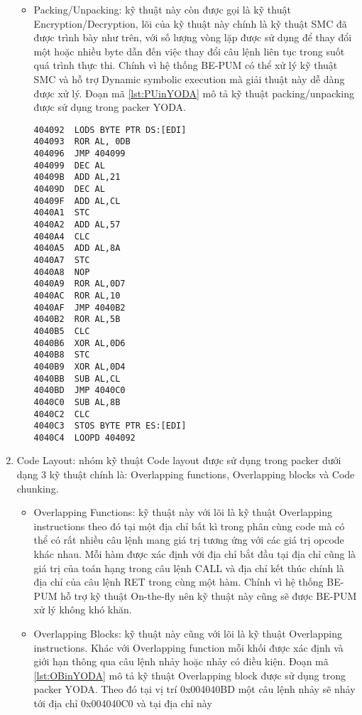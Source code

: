 \begin{enumerate}
{\begin{itemize}
{\begin{code}
\begin{lstlisting}[captionpos=b,caption={Kỹ thuật Code Overwriting sử dụng trong packer YODA},label={lst:SMCinYODA},frame=single]
4040C3	STOS BYTE PTR ES:[EDI]
4040C6	MOV EBP, ECX
\end{lstlisting}
\end{code}
}
\item{Packing/Unpacking: kỹ thuật này còn được gọi là kỹ thuật Encryption/Decryption, lõi của kỹ thuật này chính là kỹ thuật SMC đã được trình bày như trên, với số lượng vòng lặp được sử dụng để thay đổi một hoặc nhiều byte dẫn đến việc thay đổi câu lệnh liên tục trong suốt quá trình thực thi. Chính vì hệ thống BE-PUM có thể xử lý kỹ thuật SMC và hỗ trợ Dynamic symbolic execution mà giải thuật này dễ dàng được xử lý. Đoạn mã \ref {lst:PUinYODA} mô tả kỹ thuật packing/unpacking được sử dụng trong packer YODA.  
\begin{code}
\begin{lstlisting}[captionpos=b,caption={Kỹ thuật Packing/unpacking sử dụng trong packer YODA},label={lst:PUinYODA},frame=single]
404092	LODS BYTE PTR DS:[EDI]
404093	ROR AL, 0DB
404096	JMP 404099
404099	DEC AL
40409B	ADD AL,21
40409D	DEC AL
40409F	ADD AL,CL
4040A1	STC
4040A2	ADD AL,57
4040A4	CLC
4040A5	ADD AL,8A
4040A7	STC
4040A8	NOP
4040A9	ROR AL,0D7
4040AC	ROR AL,10
4040AF	JMP 4040B2
4040B2	ROR AL,5B
4040B5	CLC
4040B6	XOR AL,0D6
4040B8	STC
4040B9	XOR AL,0D4
4040BB	SUB AL,CL
4040BD	JMP 4040C0 
4040C0	SUB AL,8B
4040C2	CLC		
4040C3	STOS BYTE PTR ES:[EDI]
4040C4	LOOPD 404092
\end{lstlisting}
\end{code}
}
\end{itemize}
}
\item{Code Layout: nhóm kỹ thuật Code layout được sử dụng trong packer dưới dạng 3 kỹ thuật chính là: Overlapping functions, Overlapping blocks và Code chunking.
\begin{itemize}
\item{Overlapping Functions: kỹ thuật này với lõi là kỹ thuật Overlapping instructions theo đó tại một địa chỉ bất kì trong phân cùng code mà có thể có rất nhiều câu lệnh mang giá trị tương ứng với các giá trị opcode khác nhau. Mỗi hàm được xác định với địa chỉ bắt đầu tại địa chỉ cũng là giá trị của toán hạng trong câu lệnh CALL và địa chỉ kết thúc chính là địa chỉ của câu lệnh RET trong cùng một hàm. Chính vì hệ thống BE-PUM hỗ trợ kỹ thuật On-the-fly nên kỹ thuật này cũng sẽ được BE-PUM xử lý không khó khăn.\\}
\item{Overlapping Blocks: kỹ thuật này cũng với lõi là kỹ thuật Overlapping instructions. Khác với Overlapping function mỗi khối được xác định và giới hạn thông qua câu lệnh nhảy hoặc nhảy có điều kiện. Đoạn mã \ref {lst:OBinYODA} mô tả kỹ thuật Overlapping block được sử dụng trong packer YODA. Theo đó tại vị trí 0x004040BD một câu lệnh nhảy sẽ nhảy tới địa chỉ 0x004040C0 và tại địa chỉ này 
}
\end{itemize}}
\end{enumerate}

